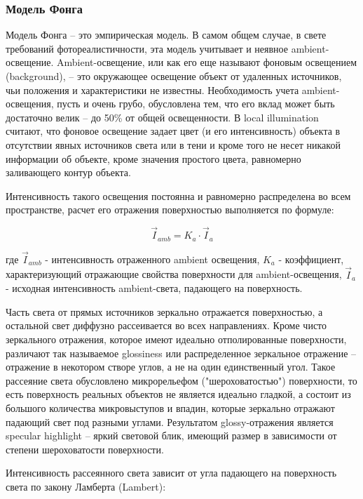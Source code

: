 \documentclass[12pt, a4paper, utf8]{article}
\begin{document}
\subsubsection{Модель Фонга}

Модель Фонга -- это эмпирическая модель. В самом общем случае, в свете требований фотореалистичности, эта модель учитывает и неявное ambient-освещение. Ambient-освещение, или как его еще называют фоновым освещением (background), -- это окружающее освещение объект от удаленных источников, чьи положения и характеристики не известны. Необходимость учета ambient-освещения, пусть и очень грубо, обусловлена тем, что его вклад может быть достаточно велик -- до 50\% от общей освещенности. В local illumination считают, что фоновое освещение задает цвет (и его интенсивность) объекта в отсутствии явных источников света или в тени  и кроме того не несет никакой информации об объекте, кроме значения простого цвета, равномерно заливающего контур объекта.

Интенсивность такого освещения постоянна и равномерно распределена во всем пространстве, расчет его отражения поверхностью выполняется по формуле:

$$
 \vec{I}_{amb} = K_{a} \cdot \vec{I}_{a}
$$

где $\vec{I}_{amb}$  - интенсивность отраженного ambient освещения, $K_{a}$ - коэффициент, характеризующий отражающие свойства поверхности для  ambient-освещения, $\vec{I}_{a}$ - исходная интенсивность ambient-света, падающего на поверхность.

Часть света от прямых источников зеркально отражается поверхностью, а остальной свет диффузно рассеивается во всех направлениях. Кроме чисто зеркального отражения, которое имеют идеально отполированные поверхности, различают так называемое glossiness или распределенное зеркальное отражение – отражение в некотором створе углов, а не на один единственный угол. Такое рассеяние света обусловлено микрорельефом ("шероховатостью") поверхности, то есть поверхность реальных объектов не является идеально гладкой, а состоит из большого количества микровыступов и впадин, которые зеркально отражают падающий свет под разными углами. Результатом glossy-отражения является specular highlight – яркий световой блик, имеющий размер в зависимости от степени шероховатости поверхности. 

Интенсивность рассеянного света зависит от угла падающего на поверхность света по закону Ламберта (Lambert):
\end{document}
